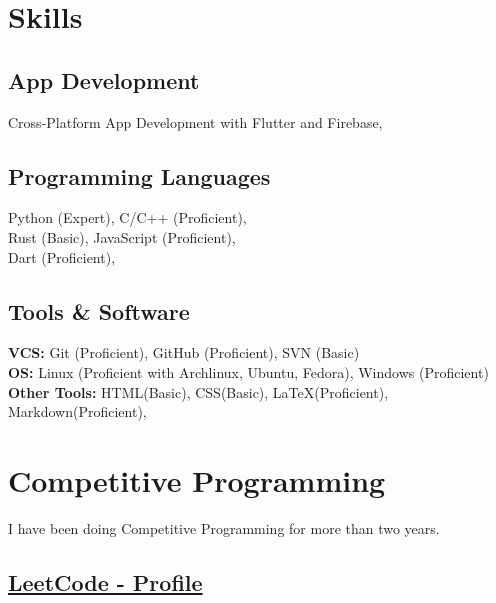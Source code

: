 \documentclass[]{m abbas resume' 2022}
\begin{document}
\begin{minipage}[t]{0.39\textwidth} 
    


\section{Skills}
\subsection{App Development}
Cross-Platform App Development with Flutter and Firebase,

\subsection{Programming Languages}
Python (Expert), 
C/C++ (Proficient), \\
Rust (Basic),
JavaScript (Proficient),\\ 
Dart (Proficient), 

\subsection{Tools \& Software}
\textbf{VCS:} Git (Proficient), GitHub (Proficient), SVN (Basic) \\ 
\textbf{OS:} Linux (Proficient with Archlinux, Ubuntu, Fedora), Windows (Proficient) \\ 
\textbf{Other Tools:}
HTML(Basic),
CSS(Basic),
LaTeX(Proficient),
Markdown(Proficient), 


\section{Competitive Programming} 
I have been doing Competitive Programming for more than two years. \\ 
\subsection{\href{https://leetcode.com/smabbasht/}{\textbf{LeetCode - Profile}}}

\end{minipage}
\end{document}
